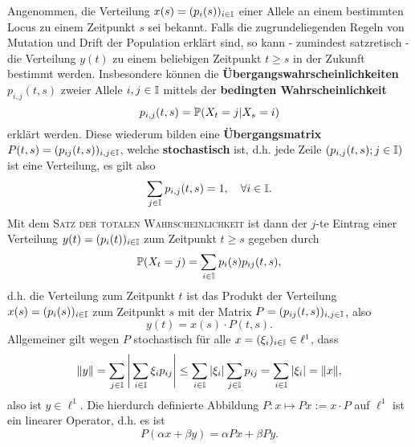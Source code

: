 \documentclass[a4paper]{paper}
\numberwithin{equation}{satz}
\begin{document}
\begin{comment}
\begin{prop}
  Sei $x\colon[a,b]\to X$ eine banachraumwertige Abbildung. Ist $x$ stetig, dann ist $x$ integrierbar.
\end{prop}

\begin{prop}
  Sei $x\colon[a,b]\to \ell^1, t\mapsto (\xi_i(t))_{i\in\mathbb I}$ stetige Abbildung. Dann gilt:
  \begin{compactenum}
      \item Die Abbildung $[a,b]\ni t\mapsto\|x(t)\|$ ist stetig, also integrierbar. 
      \item Es gilt $\Big\|\int_a^b x(t)\text dt\Big\| \leq\int_a^b\|x(t)\|\text dt$.
      \item Für alle $i\in\mathbb I$ ist der $i$-te Eintrag der Folge $\int_a^b x(t)\text dt$ gleich $\int_a^b\xi_i(t)\text dt$.
  \end{compactenum}
\end{prop}
\end{comment}

Angenommen, die Verteilung $x(s)=(p_i(s))_{i\in\I}$ einer Allele an einem bestimmten Locus zu einem Zeitpunkt $s$ sei bekannt. Falls die zugrundeliegenden Regeln von Mutation und Drift der Population erklärt sind, so kann - zumindest satzretisch - die Verteilung $y(t)$ zu einem beliebigen Zeitpunkt $t\geq s$ in der Zukunft bestimmt werden. Insbesondere können die \textbf{Übergangswahrscheinlichkeiten} $p_{i,j}(t,s)$ zweier Allele $i,j\in\I$ mittels der \textbf{bedingten Wahrscheinlichkeit} 
$$p_{i,j}(t,s)=\P(X_t=j|X_s=i)$$ erklärt werden. Diese wiederum bilden eine \textbf{Übergangsmatrix} $P(t,s)=(p_{ij}(t,s))_{i,j\in\I}$, welche \textbf{stochastisch} ist, d.h. jede Zeile $(p_{i,j}(t,s);j\in\I)$ ist eine Verteilung, es gilt also  $$\sum_{j\in \I} p_{i,j}(t,s)=1,\quad\forall i\in \I.$$
Mit dem \textsc{Satz der totalen Wahrscheinlichkeit} ist dann der $j$-te Eintrag einer Verteilung $y(t)=(p_i(t))_{i\in\I}$ zum Zeitpunkt $t\geq s$ gegeben durch 
$$\P(X_t=j)=\sum_{i\in\I}p_i(s) p_{ij}(t,s),$$ d.h. die Verteilung zum Zeitpunkt $t$ ist das Produkt der Verteilung $x(s)=(p_i(s))_{i\in\I}$ zum Zeitpunkt $s$ mit der Matrix $P=(p_{ij}(t,s))_{i,j\in\I}$, also $$y(t)= x(s)\cdot P(t,s).$$ Allgemeiner gilt wegen $P$ stochastisch für alle $x=(\xi_i)_{i\in\I}\in\ell^1$, dass $$\|y\|=\sum_{j\in\I}\Bigg|\sum_{i\in\I}\xi_i p_{ij}\Bigg|\leq\sum_{i\in\I}|\xi_i|\sum_{j\in\I}p_{ij}=\sum_{i\in\I}|\xi_i|=\|x\|,$$ 
also ist $y\in\ell^1$. Die hierdurch definierte Abbildung $P\colon x\mapsto Px:=x\cdot P$  auf $\ell^1$ ist ein  linearer Operator, d.h. es ist $$P(\alpha x+\beta y)=\alpha Px + \beta Py.$$
\end{document}
